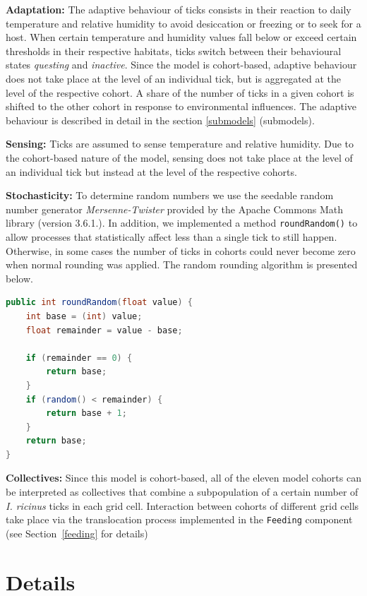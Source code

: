 \documentclass[a4paper, 11pt]{scrartcl}
\newcommand{\inlinecode}[1]{\texttt{\small #1}}
\begin{document}
\textbf{Adaptation:} The adaptive behaviour of ticks consists in their reaction to daily temperature and relative humidity to avoid desiccation or freezing or to seek for a host. When certain temperature and humidity values fall below or exceed certain thresholds in their respective habitats, ticks switch between their behavioural states \emph{questing} and \emph{inactive}. Since the model is cohort-based, adaptive behaviour does not take place at the level of an individual tick, but is aggregated at the level of the respective cohort. A share of the number of ticks in a given cohort is shifted to the other cohort in response to environmental influences. The adaptive behaviour is described in detail in the section \ref{submodels} (submodels).

\textbf{Sensing:} Ticks are assumed to sense temperature and relative humidity. Due to the cohort-based nature of the model, sensing does not take place at the level of an individual tick but instead at the level of the respective cohorts.

\textbf{Stochasticity:} To determine random numbers we use the seedable random number generator \emph{Mersenne-Twister} provided by the Apache Commons Math library (version 3.6.1.). In addition, we implemented a method \inlinecode{roundRandom()} to allow processes that statistically affect less than a single tick to still happen. Otherwise, in some cases the number of ticks in cohorts could never become zero when normal rounding was applied. The random rounding algorithm is presented below.

\begin{lstlisting}[language = Java, caption = {Overview of roundRandom() method}]
public int roundRandom(float value) {
	int base = (int) value;
	float remainder = value - base;
	
	if (remainder == 0) {
		return base;
	}
	if (random() < remainder) {
		return base + 1;
	}
	return base;
}
\end{lstlisting}


\textbf{Collectives:} Since this model is cohort-based, all of the eleven model cohorts can be interpreted as collectives that combine a subpopulation of a certain number of \emph{I. ricinus} ticks in each grid cell. Interaction between cohorts of different grid cells take place via the translocation process implemented in the \inlinecode{Feeding} component (see Section~\ref{feeding} for details)


\newpage
\section{Details}
\end{document}
